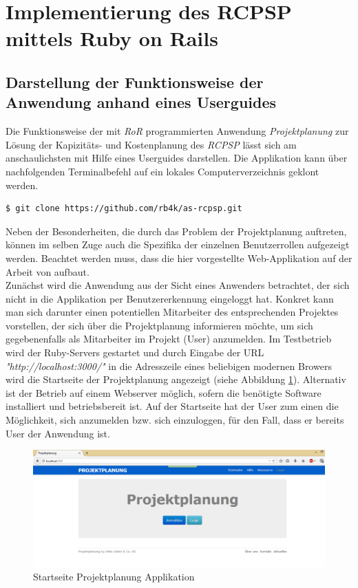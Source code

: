 \documentclass[a4paper,12pt,parskip,bibtotoc,liststotoc]{article}
\begin{document}
\section{Implementierung des RCPSP mittels Ruby on Rails} \label{Haupt}

\subsection{Darstellung der Funktionsweise der Anwendung anhand eines Userguides}\label{User}
Die Funktionsweise der mit \textit{RoR} programmierten Anwendung \textit {\glqq Projektplanung\grqq} zur Lösung der Kapizitäts- und Kostenplanung des \textit{RCPSP} lässt sich am anschaulichsten mit Hilfe eines Userguides darstellen. Die Applikation kann über nachfolgenden Terminalbefehl auf ein lokales Computerverzeichnis geklont werden.
\begin{lstlisting}[style=Befehl]
$ git clone https://github.com/rb4k/as-rcpsp.git
\end{lstlisting}

Neben der Besonderheiten, die durch das Problem der Projektplanung auftreten, können im selben Zuge auch die Spezifika der einzelnen Benutzerrollen aufgezeigt werden. Beachtet werden muss, dass die hier vorgestellte Web-Applikation auf der Arbeit von \cite{hartl2012ruby} aufbaut.\\

Zunächst wird die Anwendung aus der Sicht eines Anwenders betrachtet, der sich nicht in die Applikation per Benutzererkennung eingeloggt hat. Konkret kann man sich darunter einen potentiellen Mitarbeiter des entsprechenden Projektes vorstellen, der sich über die Projektplanung informieren möchte, um sich gegebenenfalls als Mitarbeiter im Projekt (User) anzumelden. Im Testbetrieb wird der Ruby-Servers gestartet und durch Eingabe der URL \textit {"http://localhost:3000/"} in die Adresszeile eines beliebigen modernen Browers wird die Startseite der Projektplanung angezeigt (siehe Abbildung \ref{Start}). Alternativ ist der Betrieb auf einem Webserver möglich, sofern die benötigte Software installiert und betriebsbereit ist. Auf der Startseite hat der User zum einen die Möglichkeit, sich anzumelden bzw. sich einzuloggen, für den Fall, dass er bereits User der Anwendung ist. \\

\begin{figure}[h!]
  \begin{center}
    \includegraphics[width=150mm]{Bilder/Startseite_unsigned.png}
    \caption{Startseite Projektplanung Applikation}  \label{Start}
  \end{center}
\end{figure}
\end{document}
